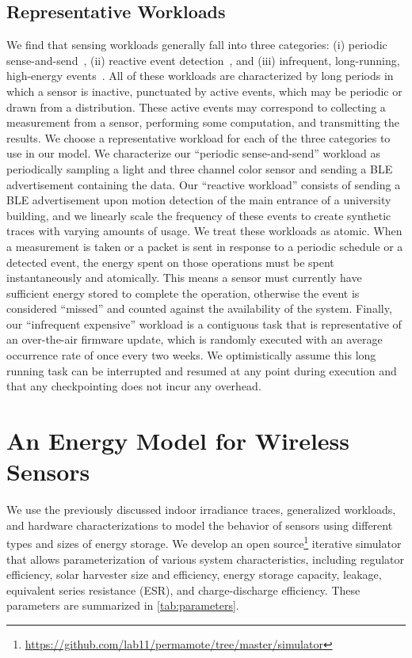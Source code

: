 \subsection{Representative Workloads}
We find that sensing workloads generally fall into three
categories: (i) periodic sense-and-send~\cite{mainwaring2002wireless}, (ii) reactive event detection~\cite{campbellEnergy14,afanasov2020battery}, and (iii) infrequent,
long-running, high-energy events~\cite{levis2004trickle}. 
All of these workloads are characterized by long periods in which a sensor is inactive, punctuated by active events, which may be periodic or drawn from a distribution.
These active events may correspond to collecting a measurement from a sensor, performing some computation, and transmitting the results.
We choose a representative workload for each
of the three categories to use in our model.
We characterize our ``periodic sense-and-send''
workload as periodically sampling a light and three channel color sensor and sending a
BLE advertisement containing the data.
Our ``reactive workload'' consists of sending a BLE advertisement upon motion detection of the main
entrance of a university building, and we linearly scale the frequency
of these events to create synthetic traces with varying amounts of usage. 
We treat these workloads as atomic. 
When a measurement is taken or a packet is sent in response to a periodic schedule or a detected event, the energy spent on those operations must be spent instantaneously and atomically. 
This means a sensor must currently have sufficient energy stored to complete the operation, otherwise the event is considered ``missed'' and counted against the availability of the system.
Finally, our ``infrequent expensive'' workload is a
contiguous
task that is representative of an
over-the-air firmware update, which is randomly executed with an average occurrence rate
of once every two weeks.
We optimistically assume this long running task can be interrupted
and resumed at any point during execution and that any checkpointing does not incur any overhead.


\section{An Energy Model for Wireless Sensors}
We use the previously discussed indoor irradiance traces, generalized
workloads, and hardware characterizations to model the behavior of sensors
using different types and sizes of energy storage. We develop an open
source\footnote{\url{https://github.com/lab11/permamote/tree/master/simulator}}
iterative simulator that allows parameterization of various system
characteristics, including regulator efficiency, solar harvester size
and efficiency, energy storage capacity, leakage, equivalent series resistance (ESR), and charge-discharge
efficiency. These parameters are summarized in \cref{tab:parameters}.

